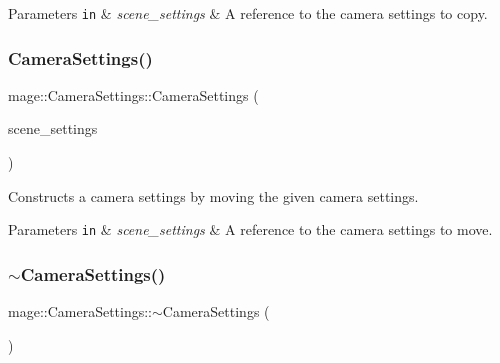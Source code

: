 \begin{DoxyParams}[1]{Parameters}
\mbox{\tt in}  & {\em scene\+\_\+settings} & A reference to the camera settings to copy. \\
\hline
\end{DoxyParams}
\hypertarget{structmage_1_1_camera_settings_a006a0cb2758137b14c65c4788f25d41e}{}\label{structmage_1_1_camera_settings_a006a0cb2758137b14c65c4788f25d41e} 
\subsubsection{\texorpdfstring{Camera\+Settings()}{CameraSettings()}\hspace{0.1cm}{\footnotesize\ttfamily [3/3]}}
{\footnotesize\ttfamily mage\+::\+Camera\+Settings\+::\+Camera\+Settings (\begin{DoxyParamCaption}\item[{\hyperlink{structmage_1_1_camera_settings}{Camera\+Settings} \&\&}]{scene\+\_\+settings }\end{DoxyParamCaption})\hspace{0.3cm}{\ttfamily [default]}}

Constructs a camera settings by moving the given camera settings.


\begin{DoxyParams}[1]{Parameters}
\mbox{\tt in}  & {\em scene\+\_\+settings} & A reference to the camera settings to move. \\
\hline
\end{DoxyParams}
\hypertarget{structmage_1_1_camera_settings_a738a93dc2e1aed2cac7a58af658984f3}{}\label{structmage_1_1_camera_settings_a738a93dc2e1aed2cac7a58af658984f3} 
\subsubsection{\texorpdfstring{$\sim$\+Camera\+Settings()}{~CameraSettings()}}
{\footnotesize\ttfamily mage\+::\+Camera\+Settings\+::$\sim$\+Camera\+Settings (\begin{DoxyParamCaption}{ }\end{DoxyParamCaption})\hspace{0.3cm}{\ttfamily [default]}}

